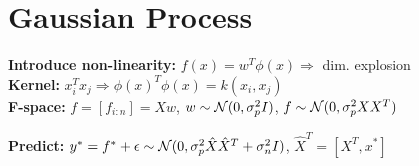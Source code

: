 \begin{comment}
	\pagebreak
\end{comment}

\section{Gaussian Process}
\begin{comment}
	Generalization of Bayesian linear regression. 
	Gaussian Processes are looking at it from the function space, e.g. models distributions over functions directly.\\
	In Bayesian linear regression we modelled the distribution over the weights.\\
\end{comment}

\textbf{Introduce non-linearity:} $f(x) = w^T \phi(x) \Rightarrow$ dim. explosion\\

\textbf{Kernel:} $x_i^T x_j \Rightarrow \phi(x)^T \phi(x) = k(x_i, x_j)$\\

\textbf{F-space:} $f = [f_{i:n}] = Xw$, $w\sim \mathcal{N}(0, \sigma_p^2I)$, $f \sim \mathcal{N}(0, \sigma_p^2 XX^T)$\\
\begin{comment}
	Instead of thinking about Gaussian priors on the weights w (weight-space), we think about gaussian priors on the function values $f=w^Tx$ (function-space).\\
	The linear model then only encodes correlations between the functions through the Kernel, we only need to model how new functions (linearly transformed points) are correlating to the functions we have.\\
	The conversion from weight space to function space happens through linear transformation of the weights, this assumes X to be constant!\\
\end{comment}

\textbf{Predict:} $y^* = f^* + \epsilon \sim \mathcal{N}(0, \sigma_p^2 \hat{X}\hat{X}^T + \sigma_n^2 I)$, $\hat{X}^T = [X^T,x^*]$ \\
\begin{comment}
	Data only enters through the inner products, which make kernels very useful.
	The it models how new data correlates with already given data.\\

	\textbf{Intuition:} We place a prior on functions that correlate with our data.
	Functions that agree with our prior and have a high likelihood are more likely, due to bayes: $P(f | data) = P(f) P(data | f)$\\
\end{comment}

